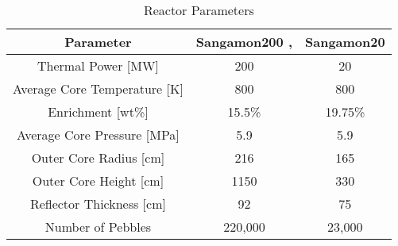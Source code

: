 \begin{table}[h!]
\centering
\caption{Reactor Parameters}
\begin{tabular}{ c  c  c }
\hline
Parameter & Sangamon200 \cite{harlan_x-energy_2018}, \cite{harlan_ans_2017} & Sangamon20 \\
\hline
Thermal Power [MW] & 200 & 20 \\
Average Core Temperature [K] & 800 & 800 \\
Enrichment [wt\%] & 15.5\% & 19.75\% \\
Average Core Pressure [MPa] & 5.9 & 5.9 \\
Outer Core Radius [cm] & 216 & 165 \\
Outer Core Height [cm] & 1150 & 330 \\
Reflector Thickness [cm] & 92 & 75 \\
Number of Pebbles & 220,000 & 23,000 \\
\hline
\end{tabular}

\label{table:params1}
\end{table}